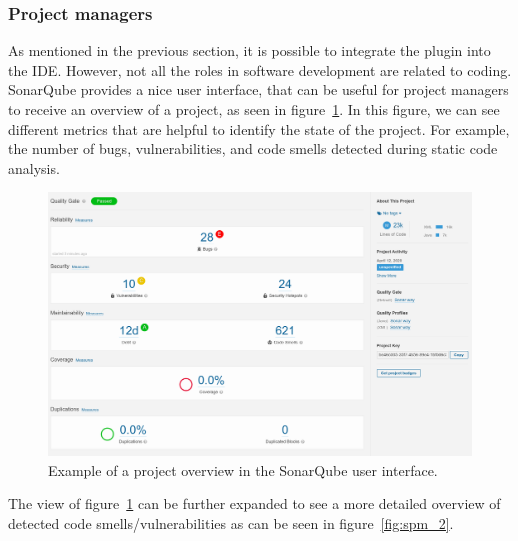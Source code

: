 \FloatBarrier

\subsubsection{Project managers}

As mentioned in the previous section, it is possible to integrate the plugin into the IDE.
However, not all the roles in software development are related to coding.
SonarQube provides a nice user interface, that can be useful for project managers to receive an overview of a project,
as seen in figure~\ref{fig:spm_1}.
In this figure, we can see different metrics that are helpful to identify the state of the project.
For example, the number of bugs, vulnerabilities, and code smells detected during static code analysis.

\begin{figure}
    \includegraphics[scale=0.35]{figures/project_managers_1.png}
    \caption{Example of a project overview in the SonarQube user interface.}
    \label{fig:spm_1}
\end{figure}

The view of figure~\ref{fig:spm_1} can be further expanded to see a more detailed overview of detected
code smells/vulnerabilities as can be seen in figure~\ref{fig:spm_2}.

